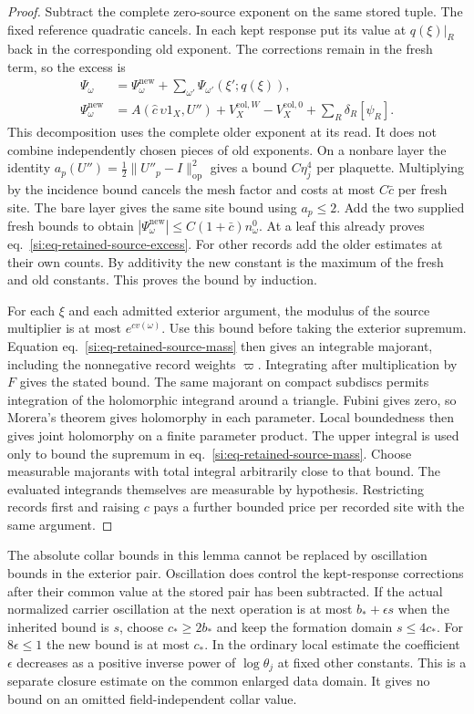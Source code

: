 \documentclass[11pt,letterpaper,reqno]{amsart}
\numberwithin{equation}{section}
\renewcommand{\eqref}[1]{\textup{eq.~\ref{#1}}}
\theoremstyle{definition}
\theoremstyle{remark}
\begin{document}
\begin{proof}
Subtract the complete zero-source exponent on the same stored
tuple. The fixed reference quadratic cancels. In each kept
response put its value at $q(\xi)|_R$ back in the corresponding
old exponent. The corrections remain in the fresh term, so the
excess is
\begin{align*}
 \Psi_\omega&=\Psi_\omega^{\mathrm{new}}
        +\sum_{\omega'}\Psi_{\omega'}(\xi';q(\xi)),\\
 \Psi_\omega^{\mathrm{new}}
   &=A(\widehat c\,\upsilon 1_X,U'')
     +V_X^{\mathrm{col},W}-V_X^{\mathrm{col},0}
     +\sum_R\delta_R[\psi_R].
\end{align*}
This decomposition uses the complete older exponent at its read.
It does not combine independently chosen pieces of old exponents.
On a nonbare layer the identity
$a_p(U'')=\tfrac12\|U''_p-I\|_{\mathrm{op}}^2$ gives a bound
$C\eta_j^4$ per plaquette. Multiplying by the incidence bound
cancels the mesh factor and costs at most $C\bar c$ per fresh
site. The bare layer gives the same site bound using $a_p\le2$.
Add the two supplied fresh bounds to obtain
$|\Psi_\omega^{\mathrm{new}}|\le C(1+\bar c)n_\omega^0$.
At a leaf this already proves \eqref{si:eq-retained-source-excess}.
For other records add the older estimates at their own counts.
By additivity the new constant is the maximum of the fresh and
old constants. This proves the bound by induction.

For each $\xi$ and each admitted exterior argument, the modulus
of the source multiplier is at most $e^{c v(\omega)}$. Use this
bound before taking the exterior supremum. Equation
\eqref{si:eq-retained-source-mass} then gives an integrable
majorant, including the nonnegative record weights $\varpi$.
Integrating after multiplication by $F$ gives the stated bound.
The same majorant on compact subdiscs permits integration of
the holomorphic integrand around a triangle. Fubini gives zero,
so Morera's theorem gives holomorphy in each parameter. Local
boundedness then gives joint holomorphy on a finite parameter
product. The upper integral is used only to bound the supremum
in \eqref{si:eq-retained-source-mass}. Choose measurable majorants
with total integral arbitrarily close to that bound. The evaluated
integrands themselves are measurable by hypothesis. Restricting records first and
raising $c$ pays a further bounded price per recorded site with
the same argument.
\end{proof}

The absolute collar bounds in this lemma cannot be replaced by
oscillation bounds in the exterior pair. Oscillation does control
the kept-response corrections after their common value at the
stored pair has been subtracted. If the actual normalized carrier
oscillation at the next operation is at most $b_*+\epsilon s$
when the inherited bound is $s$, choose $c_*\ge 2b_*$ and keep
the formation domain $s\le4c_*$. For $8\epsilon\le1$ the new
bound is at most $c_*$. In the ordinary local estimate the
coefficient $\epsilon$ decreases as a positive inverse power of
$\log\theta_j$ at fixed other constants. This is a separate
closure estimate on the common enlarged data domain. It gives
no bound on an omitted field-independent collar value.
\end{document}
